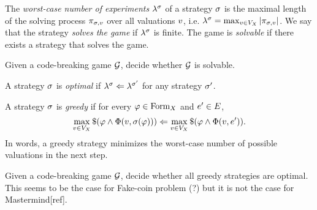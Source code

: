The \emph{worst-case number of experiments} $\lambda^{\sigma}$
  of a strategy $\sigma$ is the maximal length of the solving process
  $\pi_{\sigma,v}$ over all valuations $v$, i.e.
  $\lambda^{\sigma} = \max_{v\in V_X} |\pi_{\sigma,v}|$.
We say that the strategy \emph{solves the game} if $\lambda^{\sigma}$ is finite.
The game is \emph{solvable} if there exists a strategy that solves the game.

\begin{problem}
Given a code-breaking game $\mathcal{G}$, decide whether $\mathcal{G}$ is solvable.
\end{problem}

\begin{definition}
A strategy $\sigma$ is \emph{optimal} if
  $\lambda^{\sigma} <= \lambda^{\sigma'}$ for any strategy $\sigma'$.

A strategy $\sigma$ is \emph{greedy} if
  for every $\varphi\in\textrm{Form}_X$ and $e'\in E$,
\[
\max_{v\in V_X} \$(\varphi \wedge \Phi(v, \sigma(\varphi))) <=
\max_{v\in V_X} \$(\varphi \wedge \Phi(v, e')).
\]
In words, a greedy strategy minimizes
  the worst-case number of possible valuations in the next step.
\end{definition}

\begin{problem}
Given a code-breaking game $\mathcal{G}$,
  decide whether all greedy strategies are optimal.
This seems to be the case for Fake-coin problem (?)
  but it is not the case for Mastermind[ref].
\end{problem}


